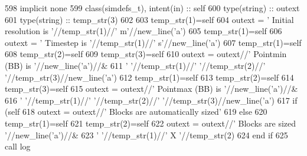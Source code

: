 \begin{DoxyCode}
598     \textcolor{keywordtype}{implicit none}
599     \textcolor{keywordtype}{class}(simdefs\_t), \textcolor{keywordtype}{intent(in)} :: self
600     \textcolor{keywordtype}{type}(string) :: outext
601     \textcolor{keywordtype}{type}(string) :: temp\_str(3)
602 
603     temp\_str(1)=self%
604     outext = \textcolor{stringliteral}{'      Initial resolution is '}//temp\_str(1)//\textcolor{stringliteral}{' m'}//new\_line(\textcolor{stringliteral}{'a'})
605     temp\_str(1)=self%
606     outext = \textcolor{stringliteral}{'      Timestep is '}//temp\_str(1)//\textcolor{stringliteral}{' s'}//new\_line(\textcolor{stringliteral}{'a'})
607     temp\_str(1)=self%
608     temp\_str(2)=self%
609     temp\_str(3)=self%
610     outext = outext//\textcolor{stringliteral}{'       Pointmin (BB) is '}//new\_line(\textcolor{stringliteral}{'a'})//&
611         \textcolor{stringliteral}{'       '}//temp\_str(1)//\textcolor{stringliteral}{' '}//temp\_str(2)//\textcolor{stringliteral}{' '}//temp\_str(3)//new\_line(\textcolor{stringliteral}{'a'})
612     temp\_str(1)=self%
613     temp\_str(2)=self%
614     temp\_str(3)=self%
615     outext = outext//\textcolor{stringliteral}{'       Pointmax (BB) is '}//new\_line(\textcolor{stringliteral}{'a'})//&
616         \textcolor{stringliteral}{'       '}//temp\_str(1)//\textcolor{stringliteral}{' '}//temp\_str(2)//\textcolor{stringliteral}{' '}//temp\_str(3)//new\_line(\textcolor{stringliteral}{'a'})
617     \textcolor{keywordflow}{if} (self%
618         outext = outext//\textcolor{stringliteral}{'       Blocks are automatically sized'}
619     \textcolor{keywordflow}{else}
620         temp\_str(1)=self%
621         temp\_str(2)=self%
622         outext = outext//\textcolor{stringliteral}{'       Blocks are sized '}//new\_line(\textcolor{stringliteral}{'a'})//&
623             \textcolor{stringliteral}{'       '}//temp\_str(1)//\textcolor{stringliteral}{' X '}//temp\_str(2)
624 \textcolor{keywordflow}{    end if}
625     \textcolor{keyword}{call }log%
\end{DoxyCode}
\mbox{\label{namespacesimulation__globals__mod_a97c04d0289a9f2d004a9329cb7ab16f0}} 

